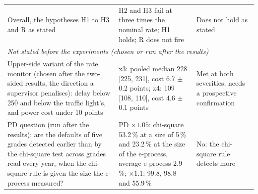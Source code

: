 \begin{table}[htbp]
\begin{tabular}{p{6.0cm}p{6.6cm}p{2.4cm}}
\relax Overall, the hypotheses H1 to H3 and R as stated & \relax H2 and H3 fail at three times the nominal rate; H1 holds; R does not fire & \relax Does not hold as stated \\
\multicolumn{3}{l}{\textit{Not stated before the experiments (chosen or run after the results)}} \\
\relax Upper-side variant of the rate monitor (chosen after the two-sided results, the direction a supervisor penalises): delay below 250 and below the traffic light's, and power cost under 10 points & \relax x3: pooled median 228 [225, 231], cost 6.7 $\pm$ 0.2 points; x4: 109 [108, 110], cost 4.6 $\pm$ 0.1 points & \relax Met at both severities; needs a prospective confirmation \\
\relax PD question (run after the results): are the defaults of five grades detected earlier than by the chi-square test across grades read every year, when the chi-square rule is given the size the e-process measured? & \relax PD $\times 1.05$: chi-square 53.2\,\% at a size of 5\,\% and 23.2\,\% at the size of the e-process, average e-process 2.9\,\%; $\times 1.1$: 99.8, 98.8 and 55.9\,\% & \relax No: the chi-square rule detects more \\
\bottomrule
\end{tabular}
\end{table}
